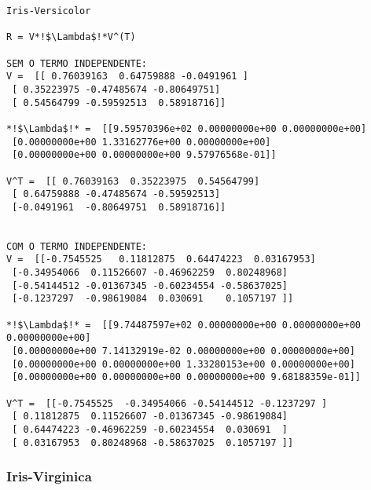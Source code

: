 \documentclass[a4paper,12pt,twoside]{article}
\begin{document}
\begin{lstlisting}
Iris-Versicolor

R = V*!$\Lambda$!*V^(T)

SEM O TERMO INDEPENDENTE: 
V =  [[ 0.76039163  0.64759888 -0.0491961 ]
 [ 0.35223975 -0.47485674 -0.80649751]
 [ 0.54564799 -0.59592513  0.58918716]]

*!$\Lambda$!* =  [[9.59570396e+02 0.00000000e+00 0.00000000e+00]
 [0.00000000e+00 1.33162776e+00 0.00000000e+00]
 [0.00000000e+00 0.00000000e+00 9.57976568e-01]]

V^T =  [[ 0.76039163  0.35223975  0.54564799]
 [ 0.64759888 -0.47485674 -0.59592513]
 [-0.0491961  -0.80649751  0.58918716]]


COM O TERMO INDEPENDENTE: 
V =  [[-0.7545525   0.11812875  0.64474223  0.03167953]
 [-0.34954066  0.11526607 -0.46962259  0.80248968]
 [-0.54144512 -0.01367345 -0.60234554 -0.58637025]
 [-0.1237297  -0.98619084  0.030691    0.1057197 ]]

*!$\Lambda$!* =  [[9.74487597e+02 0.00000000e+00 0.00000000e+00 0.00000000e+00]
 [0.00000000e+00 7.14132919e-02 0.00000000e+00 0.00000000e+00]
 [0.00000000e+00 0.00000000e+00 1.33280153e+00 0.00000000e+00]
 [0.00000000e+00 0.00000000e+00 0.00000000e+00 9.68188359e-01]]

V^T =  [[-0.7545525  -0.34954066 -0.54144512 -0.1237297 ]
 [ 0.11812875  0.11526607 -0.01367345 -0.98619084]
 [ 0.64474223 -0.46962259 -0.60234554  0.030691  ]
 [ 0.03167953  0.80248968 -0.58637025  0.1057197 ]]
\end{lstlisting}

\subsubsection{Iris-Virginica}
\end{document}

